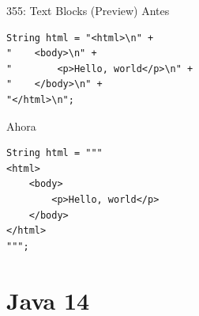\documentclass[aspectratio=169]{beamer}
\begin{document}
\begin{frame}[fragile]{355: Text Blocks (Preview)}
Antes
\begin{lstlisting}
String html = "<html>\n" +
"    <body>\n" +
"        <p>Hello, world</p>\n" +
"    </body>\n" +
"</html>\n";
\end{lstlisting}

Ahora
\begin{lstlisting}
String html = """
<html>
    <body>
        <p>Hello, world</p>
    </body>
</html>
""";
\end{lstlisting}
\end{frame}

{
    \section{Java 14}
}
\end{document}
